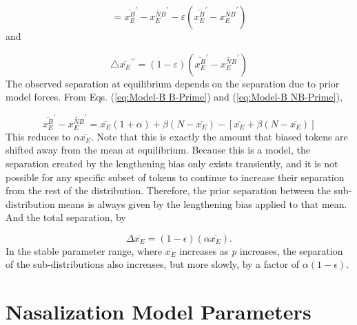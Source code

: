 \begin{equation}
=\overline{x_{E}^{B}}^{\prime}-\overline{x_{E}^{NB}}^{\prime}-\varepsilon(\overline{x_{E}^{B}}^{\prime}-\overline{x_{E}^{NB}}^{\prime})
\end{equation}
and

\begin{equation}
\triangle\overline{x_{E}}^{\prime\prime}=(1-\varepsilon)(\overline{x_{E}^{B}}^{\prime}-\overline{x_{E}^{NB}}^{\prime})
\end{equation}
The observed separation at equilibrium depends on the separation due
to prior model forces. From Eqs. (\ref{eq:Model-B B-Prime}) and (\ref{eq:Model-B NB-Prime}), 

\begin{equation}
\overline{x_{E}^{B}}^{\prime}-\overline{x_{E}^{NB}}^{\prime}=\overline{x_{E}}(1+\alpha)+\beta(N-\overline{x_{E}})-[\overline{x_{E}}+\beta(N-\overline{x_{E}})]
\end{equation}
This reduces to $\alpha\overline{x_{E}}$. Note that this is exactly
the amount that biased tokens are shifted away from the mean at equilibrium.
Because this is a  model, the separation created by
the lengthening bias only exists transiently, and it is not possible
for any specific subset of tokens to continue to increase their separation
from the rest of the distribution. Therefore, the prior separation
between the sub-distribution means is always given by the lengthening
bias applied to that mean. And the total separation, by 

\begin{equation}
\varDelta\overline{x_{E}}=(1-\epsilon)(\alpha\overline{x_{E}}).\label{eq:Cat Sep-1}
\end{equation}
In the stable parameter range, where $\overline{x_{E}}$ increases
as \emph{p} increases, the separation of the sub-distributions also
increases, but more slowly, by a factor of $\alpha(1-\epsilon)$.

\chapter{\label{chap:Appendix E}Nasalization Model Parameters}

